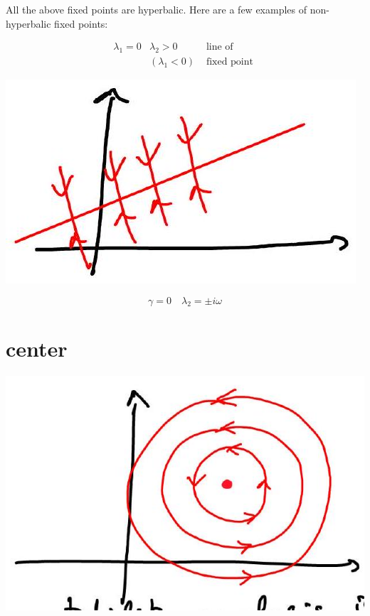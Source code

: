 \documentclass[10pt]{article}
\begin{document}
All the above fixed points are hyperbalic. Here are a few examples of non-hyperbalic fixed points:

$$
\begin{array}{lll}
\lambda_{1}=0 & \lambda_{2}>0 & \text { line of } \\
& \left(\lambda_{1}<0\right) & \text { fixed point }
\end{array}
$$

\begin{center}
\includegraphics[max width=\textwidth]{2025_10_19_55a7d61d84e6ce9a1c8cg-5}
\end{center}

$$
\gamma=0 \quad \lambda_{2}= \pm i \omega
$$

\section*{center}
\begin{center}
\includegraphics[max width=\textwidth]{2025_10_19_55a7d61d84e6ce9a1c8cg-5(2)}
\end{center}
\end{document}
